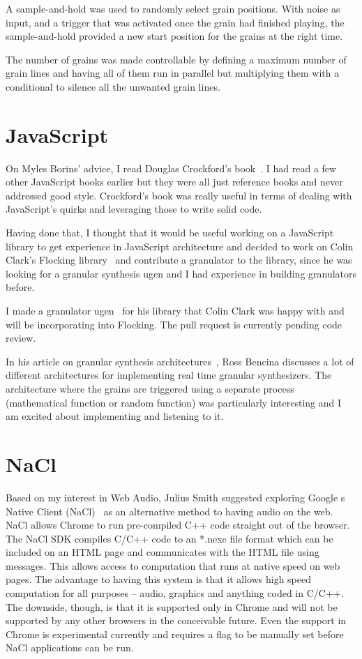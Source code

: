 \documentclass[12pt]{article}
\begin{document}
A sample-and-hold was used to randomly select grain positions. With noise as input, and a trigger that was activated once the grain had finished playing, the sample-and-hold provided a new start position for the grains at the right time.

The number of grains was made controllable by defining a maximum number of grain lines and having all of them run in parallel but multiplying them with a conditional to silence all the unwanted grain lines.

\section{JavaScript}\label{javascript}
On Myles Borins’ advice, I read Douglas Crockford’s book~\cite{Crockford}. I had read a few other JavaScript books earlier but they were all just reference books and never addressed good style. Crockford's book was really useful in terms of dealing with JavaScript’s quirks and leveraging those to write solid code.

Having done that, I thought that it would be useful working on a JavaScript library to get experience in JavaScript architecture and decided to work on Colin Clark’s Flocking library~\cite{Flocking} and contribute a granulator to the library, since he was looking for a granular synthesis ugen and I had experience in building granulators before.

I made a granulator ugen~\cite{Flocking-Granulator} for his library that Colin Clark was happy with and will be incorporating into Flocking. The pull request is currently pending code review. 

In his article on granular synthesis architectures~\cite{Bencina}, Ross Bencina 
discusses a lot of different architectures for implementing real time granular synthesizers. The architecture where the grains are triggered using a separate process (mathematical function or random function) was particularly interesting and I am excited about implementing and listening to it.

\section{NaCl}\label{nacl}
Based on my interest in Web Audio, Julius Smith suggested exploring Google
s Native Client (NaCl)~\cite{NaCl} as an alternative method to having audio on the web. NaCl allows Chrome to run pre-compiled C++ code straight out of the browser. The NaCl SDK compiles C/C++ code to an *.nexe file format which can be included on an HTML page and communicates with the HTML file using messages. This allows access to computation that runs at native speed on web pages. The advantage to having this system is that it allows high speed computation for all purposes – audio, graphics and anything coded in C/C++. The downside, though, is that it is supported only in Chrome and will not be supported by any other browsers in the conceivable future. Even the support in Chrome is experimental currently and requires a flag to be manually set before NaCl applications can be run. 
\end{document}
